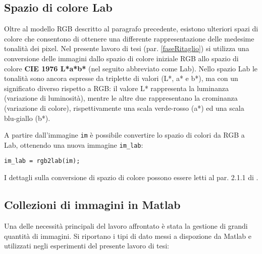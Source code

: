 \subsection{Spazio di colore Lab}
Oltre al modello RGB descritto al paragrafo precedente, esistono ulteriori spazi di colore che consentono di ottenere una differente rappresentazione delle medesime tonalità dei pixel.
Nel presente lavoro di tesi (par. \ref{faseRitaglio}) si utilizza una conversione delle immagini dallo spazio di colore iniziale RGB allo spazio di colore \textbf{CIE 1976 L*a*b*} (nel seguito abbreviato come Lab).
Nello spazio Lab le tonalità sono ancora espresse da triplette di valori (L*, a* e b*), ma con un significato diverso rispetto a RGB: il valore L* rappresenta la luminanza
(variazione di luminosità), mentre le altre due rappresentano la crominanza (variazione
di colore), rispettivamente una scala verde-rosso (a*) ed una scala blu-giallo (b*).

A partire dall’immagine \verb|im| è possibile convertire lo spazio di colori da RGB a Lab, ottenendo una nuova immagine \verb|im_lab|:
\begin{verbatim}
im_lab = rgb2lab(im);
\end{verbatim}
I dettagli sulla conversione di spazio di colore possono essere letti al par. 2.1.1 di \cite{gianvito}.

\subsection{Collezioni di immagini in Matlab}
Una delle necessità principali del lavoro affrontato è stata la gestione di grandi quantità di immagini. Si riportano i tipi di dato messi a dispozione da Matlab e utilizzati negli esperimenti del presente lavoro di tesi:

